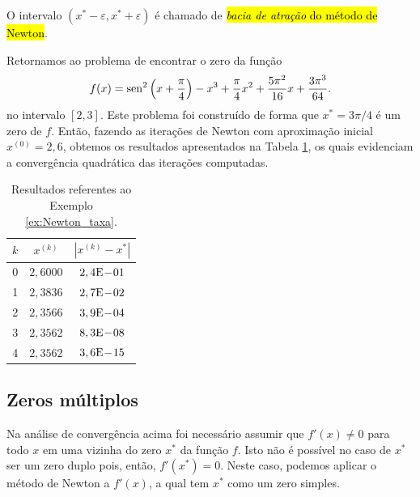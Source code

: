\begin{obs}
  O intervalo $(x^*-\varepsilon, x^*+\varepsilon)$ é chamado de \hl{\emph{bacia de atração} do método de Newton}.
\end{obs}

\begin{ex}\label{ex:Newton_taxa}
  Retornamos ao problema de encontrar o zero da função
  \begin{equation}
    f(x) = \operatorname{sen}^2\left(x+\frac{\pi}{4}\right) - x^3 + \frac{\pi}{4}x^2 + \frac{5\pi^2}{16}x + \frac{3\pi^3}{64}.
  \end{equation}
  no intervalo $[2,3]$. Este problema foi construído de forma que $x^* = 3\pi/4$ é um zero de $f$. Então, fazendo as iterações de Newton com aproximação inicial $x^{(0)}=2,6$, obtemos os resultados apresentados na Tabela \ref{tab:ex_Newton_taxa}, os quais evidenciam a convergência quadrática das iterações computadas.

\begin{table}[h!]
  \centering
  \caption{Resultados referentes ao Exemplo \ref{ex:Newton_taxa}.}
  \label{tab:ex_Newton_taxa}
  \begin{tabular}{r|cc}
    $k$ & $x^{(k)}$ & $|x^{(k)}-x^*|$ \\\hline
    0 & $2,6000$ & $2,4\mathrm{E}\!-\!01$ \\
    1 & $2,3836$ & $2,7\mathrm{E}\!-\!02$ \\
    2 & $2,3566$ & $3,9\mathrm{E}\!-\!04$ \\
    3 & $2,3562$ & $8,3\mathrm{E}\!-\!08$ \\
    4 & $2,3562$ & $3,6\mathrm{E}\!-\!15$ \\\hline
  \end{tabular}
\end{table}

\end{ex}

\subsection{Zeros múltiplos}

Na análise de convergência acima foi necessário assumir que $f'(x) \neq 0$ para todo $x$ em uma vizinha do zero $x^*$ da função $f$. Isto não é possível no caso de $x^*$ ser um zero duplo pois, então, $f'(x^*) = 0$. Neste caso, podemos aplicar o método de Newton a $f'(x)$, a qual tem $x^*$ como um zero simples.

